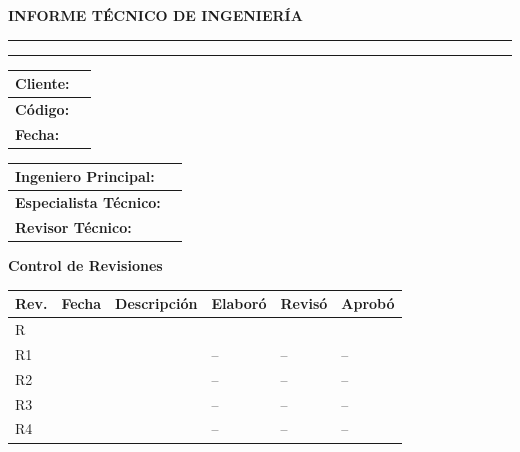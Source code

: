 \begin{titlepage}
	\thispagestyle{corporativo}

	\centering
	\vspace*{2cm}

	{\Large\bfseries INFORME TÉCNICO DE INGENIERÍA}

	\vspace{1cm}
	\rule{\linewidth}{0.4pt}

	\vspace{0.6cm}
	{\huge\bfseries \projecttitle}

	\vspace{0.6cm}
	\rule{\linewidth}{0.4pt}

	\vspace{2cm}

	\begin{flushleft}
	\begin{tabular}{|l|l|}
		\hline
		\textbf{Cliente:} & \targetcompany \\
		\hline
		\textbf{Código:} & \documentcode \\
		\hline
		\textbf{Fecha:} & \docFecha \\
		\hline
	\end{tabular}
	\end{flushleft}

	\vspace{2cm}

	\begin{flushleft}
	\begin{tabular}{|l|l|}
		\hline
		\textbf{Ingeniero Principal:} & \firmaAprobo \\
		\hline
		\textbf{Especialista Técnico:} & \firmaElaboro \\
		\hline
		\textbf{Revisor Técnico:} & \firmaReviso \\
		\hline
	\end{tabular}
	\end{flushleft}

	\vfill

	\noindent
	\textbf{Control de Revisiones}
	\label{tab:control_revisiones}
	\begin{tabularx}{\textwidth}{|l|l|X|l|l|l|}
		\hline
		\rowcolor{green!15}
		\textbf{Rev.} & \textbf{Fecha} & \textbf{Descripción} & \textbf{Elaboró} & \textbf{Revisó} & \textbf{Aprobó} \\
		\hline
		R\docRevision & \fechaRevCero & \descRevCero & \firmaElaboro & \firmaReviso & \firmaAprobo \\
		\hline
		R1 & \fechaRevUno & \descRevUno & -- & -- & -- \\
		\hline
		R2 & \fechaRevDos & \descRevDos & -- & -- & -- \\
		\hline
		R3 & \fechaRevTres & \descRevTres & -- & -- & -- \\
		\hline
		R4 & \fechaRevCuatro & \descRevCuatro & -- & -- & -- \\
		\hline
	\end{tabularx}

\end{titlepage}

\newpage

